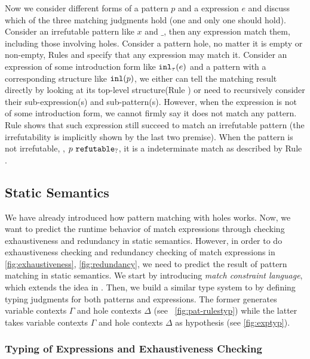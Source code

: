 Now we consider different forms of a pattern $p$ and a expression $e$ and discuss which of the three matching judgments hold (one and only one should hold).
Consider an irrefutable pattern like $x$ and $\_$, then any expression match them, including those involving holes.
Consider a pattern hole, no matter it is empty or non-empty, Rules \MMEHole and \MMHole specify that any expression may match it.
Consider an expression of some introduction form like $\mathtt{inl}_{\tau}({e})$ and a pattern with a corresponding structure like $\mathtt{inl}(p)$, we either can tell the matching result directly by looking at its top-level structure(Rule \NMConfR) or need to recursively consider their sub-expression(s) and sub-pattern(s).
However, when the expression is not of some introduction form, we cannot firmly say it does not match any pattern. Rule \MNotIntroPair shows that such expression still succeed to match an irrefutable pattern (the irrefutability is implicitly shown by the last two premise). When the pattern is not irrefutable, \ie, $p ~\mathtt{refutable}_?$, it is a indeterminate match as described by Rule \MMNotIntro.

\subsection{Static Semantics}\label{sec:statics}



We have already introduced how pattern matching with holes works. Now, we want
to predict the runtime behavior of match expressions through checking
exhaustiveness and redundancy in static semantics. However, in order to do exhaustiveness checking and redundancy
checking of match expressions in \autoref{fig:exhaustiveness},
\ref{fig:redundancy}, we need to predict the result of pattern matching in static
semantics. We start by introducing \textit{match constraint language}, which
extends the idea in \cite{Harper2012}. Then, we build a similar type system to
\cite{DBLP:journals/pacmpl/OmarVCH19} by defining typing judgments for both
patterns and expressions. The former generates variable contexts $\Gamma$ and
hole contexts $\Delta$ (see \figurename~\ref{fig:pat-rulestyp}) while the latter 
takes variable contexts $\Gamma$ and hole contexts $\Delta$ as hypothesis (see
\autoref{fig:exptyp}).

\subsubsection{Typing of Expressions and Exhaustiveness Checking} \label{sec:exptyp}

